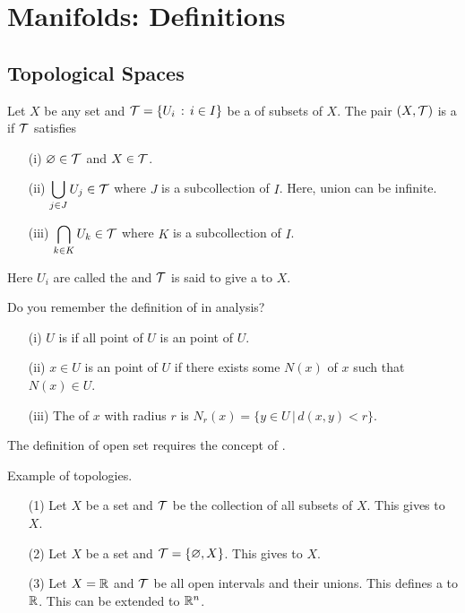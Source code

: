 \documentclass[a4paper, 10pt]{article}
\begin{document}
\setcounter{section}{3}
\setcounter{subsection}{0}
\setcounter{theorem}{0}

\section{Manifolds: Definitions}

\subsection{Topological Spaces}

\begin{definition}
    Let $X$ be any set and $\mathcal{T} = \{ U_{i} \,:\, i \in I \}$ be a  of subsets of $X$. The pair $(X, \mathcal{T})$ is a  if $\mathcal{T}$ satisfies
    \begin{itemize}
        \item[(i)] $\varnothing \in \mathcal{T}$ and $X \in \mathcal{T}$.
        \item[(ii)] $\displaystyle{\bigcup_{j \in J} U_{j} \in \mathcal{T}}$ where $J$ is a subcollection of $I$. Here, union can be infinite.
        \item[(iii)] $\displaystyle{\bigcap_{k \in K} U_{k} \in \mathcal{T}}$ where $K$ is a  subcollection of $I$.
    \end{itemize}
    Here $U_{i}$ are called the  and $\mathcal{T}$ is said to give a  to $X$.
\end{definition}

\begin{remark}
    Do you remember the definition of  in analysis?
    \begin{itemize}
        \item[(i)] $U$ is  if all point of $U$ is an  point of $U$.
        \item[(ii)] $x \in U$ is an  point of $U$ if there exists some  $N(x)$ of $x$ such that $N(x) \in U$.
        \item[(iii)] The  of $x$ with radius $r$ is $N_{r}(x) = \{ y \in U \,|\, d(x,y) < r \}$.
    \end{itemize}
    The definition of open set requires the concept of .
\end{remark}

\begin{example}
    Example of topologies.
    \begin{itemize}
        \item[(1)] Let $X$ be a set and $\mathcal{T}$ be the collection of all subsets of $X$. This gives  to $X$.
        \item[(2)] Let $X$ be a set and $\mathcal{T} = \{ \varnothing, X \}$. This gives  to $X$.
        \item[(3)] Let $X = \mathbb{R}$ and $\mathcal{T}$ be all open intervals and their unions. This defines a  to $\mathbb{R}$. This can be extended to $\mathbb{R}^{n}$.
    \end{itemize}
\end{example}
\end{document}
